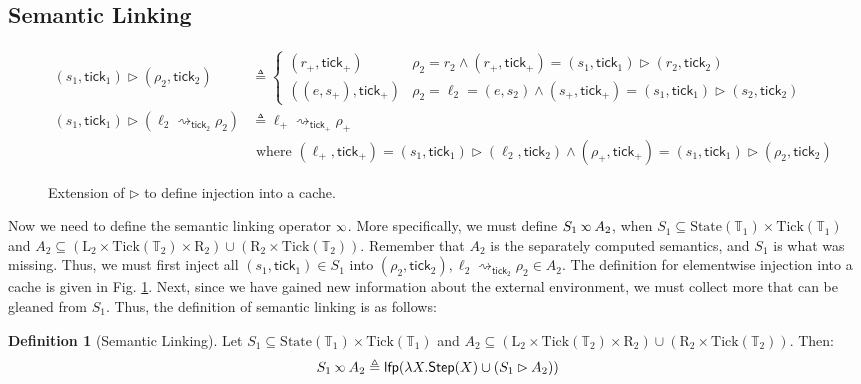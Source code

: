 \documentclass[acmsmall,review]{acmart}\settopmatter{printfolios=true,printccs=false,printacmref=false}
\theoremstyle{definition}
\newtheorem{definition}{Definition}[section]
\newcommand*{\Time}{\mathbb{T}}
\newcommand*{\Left}{\text{L}}
\newcommand*{\Right}{\text{R}}
\newcommand*{\State}{\text{State}}
\newcommand*{\Tick}{\text{Tick}}
\newcommand*{\semarrow}{\rightsquigarrow}
\newcommand*{\semlink}{\mathbin{\rotatebox[origin=c]{180}{$\propto$}}}
\newcommand*{\tick}{\mathsf{tick}}
\begin{document}
\subsection{Semantic Linking}
\begin{figure}[h!]
  \footnotesize
  \begin{align*}
    (s_1,\tick_1)\rhd(\rho_2,\tick_2)                         & \triangleq
    \begin{cases}
      (r_+,\tick_+)     & \rho_2=r_2\wedge(r_+,\tick_+)=(s_1,\tick_1)\rhd(r_2,\tick_2)            \\
      ((e,s_+),\tick_+) & \rho_2=\ell_2=(e,s_2)\wedge(s_+,\tick_+)=(s_1,\tick_1)\rhd(s_2,\tick_2)
    \end{cases} \\
    (s_1,\tick_1)\rhd(\ell_2\semarrow_{\tick_2}\rho_2) & \triangleq
    \ell_+\semarrow_{\tick_+}\rho_+                                                      \\
                                                              & \text{ where }
    (\ell_+,\tick_+)=(s_1,\tick_1)\rhd(\ell_2,\tick_2)\wedge
    (\rho_+,\tick_+)=(s_1,\tick_1)\rhd(\rho_2,\tick_2)
  \end{align*}
  \caption{Extension of $\rhd$ to define injection into a cache.}
  \label{fig:extinject}
\end{figure}
Now we need to define the semantic linking operator $\semlink$.
More specifically, we must define $S_1\semlink A_2$, when $S_1\subseteq\State(\Time_1)\times\Tick(\Time_1)$ and $A_2\subseteq(\Left_2\times\Tick(\Time_2)\times\Right_2)\cup(\Right_2\times\Tick(\Time_2))$.
Remember that $A_2$ is the separately computed semantics, and $S_1$ is what was missing.
Thus, we must first inject all $(s_1,\tick_1)\in S_1$ into $(\rho_2,\tick_2),\ell_2\semarrow_{\tick_2}\rho_2\in A_2$.
The definition for elementwise injection into a cache is given in Fig. \ref{fig:extinject}.
Next, since we have gained new information about the external environment, we must collect more that can be gleaned from $S_1$.
Thus, the definition of semantic linking is as follows:
\begin{definition}[Semantic Linking]
  Let $S_1\subseteq\State(\Time_1)\times\Tick(\Time_1)$ and $A_2\subseteq(\Left_2\times\Tick(\Time_2)\times\Right_2)\cup(\Right_2\times\Tick(\Time_2))$.
  Then:
  \[
    S_1\semlink A_2\triangleq
    \mathsf{lfp}(\lambda X.\mathsf{Step}(X)\cup(S_1\rhd A_2))
  \]
\end{definition}
\end{document}
